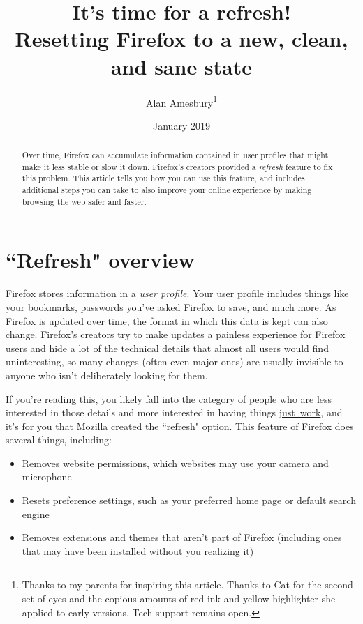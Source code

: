 \documentclass[fontsize=11pt]{article}
\begin{document}
\raggedright
{}

\title{\huge{It's time for a refresh!} \\ \small{Resetting Firefox to a new, clean, and sane state} }
\author{Alan Amesbury\thanks{Thanks to my parents for inspiring this article.  Thanks to Cat for the second set of eyes and the copious amounts of red ink and yellow highlighter she applied to early versions.  Tech support remains open.}}
\date{January 2019}


\maketitle

\begin{abstract}{Over time, Firefox can accumulate information contained in user profiles that might make it less stable or slow it down.  Firefox's creators provided a \emph{refresh} feature to fix this problem.  This article tells you how you can use this feature, and includes additional steps you can take to also improve your online experience by making browsing the web safer and faster.}
\end{abstract}




\section{``Refresh" overview}
Firefox stores information in a \emph{user profile}.  Your user profile includes things like your bookmarks, passwords you've asked Firefox to save, and much more.  As Firefox is updated over time, the format in which this data is kept can also change.  Firefox's creators try to make updates a painless experience for Firefox users and hide a lot of the technical details that almost all users would find uninteresting, so many changes (often even major ones) are usually invisible to anyone who isn't deliberately looking for them.

If you're reading this, you likely fall into the category of people who are less interested in those details and more interested in having things \underline{just~work}, and it's for you that Mozilla created the ``refresh" option.  This feature of Firefox does several things, including:
\begin{itemize}
	\item{Removes website permissions, which websites may use your camera and microphone}
	\item{Resets preference settings, such as your preferred home page or default search engine}
	\item{Removes extensions and themes that aren't part of Firefox (including ones that may have been installed without you realizing it)}
\end{itemize}
\end{document}
